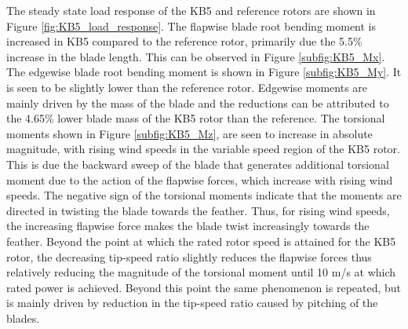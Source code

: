 The steady state load response of the KB5 and reference rotors are shown in Figure \ref{fig:KB5_load_response}. The flapwise blade root bending moment is increased in KB5 compared to the reference rotor, primarily due the 5.5\% increase in the blade length. This can be observed in Figure \ref{subfig:KB5_Mx}. The edgewise blade root bending moment is shown in Figure \ref{subfig:KB5_My}. It is seen to be slightly lower than the reference rotor. Edgewise moments are mainly driven by the mass of the blade and the reductions can be attributed to the 4.65\% lower blade mass of the KB5 rotor than the reference. The torsional moments shown in Figure \ref{subfig:KB5_Mz}, are seen to increase in absolute magnitude, with rising wind speeds in the variable speed region of the KB5 rotor. This is due the backward sweep of the blade that generates additional torsional moment due to the action of the flapwise forces, which increase with rising wind speeds. The negative sign of the torsional moments indicate that the moments are directed in twisting the blade towards the feather. Thus, for rising wind speeds, the increasing flapwise force makes the blade twist increasingly towards the feather. Beyond the point at which the rated rotor speed is attained for the KB5 rotor, the decreasing tip-speed ratio slightly reduces the flapwise forces thus relatively reducing the magnitude of the torsional moment until 10 m/s at which rated power is achieved. Beyond this point the same phenomenon is repeated, but is mainly driven by reduction in the tip-speed ratio caused by pitching of the blades.

